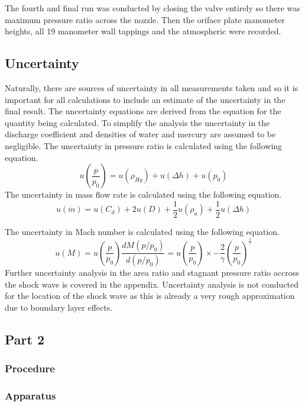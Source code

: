 \documentclass{article}
\begin{document}
The fourth and final run was conducted by closing the valve entirely so there was maximum pressure ratio across the nozzle.
Then the oriface plate manometer heights, all 19 manometer wall tappings and the atmospheric were recorded.

\subsection{Uncertainty}

Naturally, there are sources of uncertainty in all measurements taken and so it is important for all calculations to include an estimate of the uncertainty in the final result.
The uncertainty equations are derived from the equation for the quantity being calculated.
To simplify the analysis the uncertainty in the discharge coefficient and densities of water and mercury are assumed to be negligible.
The uncertainty in pressure ratio is calculated using the following equation.
\begin{equation}
    u\left( \frac{p}{p_0} \right) = u(\rho_{Hg}) + u(\Delta h) + u(p_0)
\end{equation}
The uncertainty in mass flow rate is calculated using the following equation.
\begin{equation}
    u(\dot{m}) = u(C_d) + 2u(D) + \frac{1}{2}u(\rho_a) + \frac{1}{2}u(\Delta h)
\end{equation}

The uncertainty in Mach number is calculated using the following equation.
\begin{equation}
    u(M) = u\left( \frac{p}{p_0} \right) \frac{d M ( p/p_0 ) }{d (p/p_0)} = u\left(\frac{p}{p_0}\right) \times - \frac{2}{\gamma}  \left( \frac{p}{p_0} \right) ^ {\frac{1}{\gamma}}
\end{equation}
Further uncertainty analysis in the area ratio and stagnant pressure ratio accross the shock wave is covered in the appendix.
Uncertainty analysis is not conducted for the location of the shock wave as this is already a very rough approximation due to boundary layer effects.

\subsection{Part 2}
\subsubsection{Procedure}
\subsubsection{Apparatus}
\end{document}
